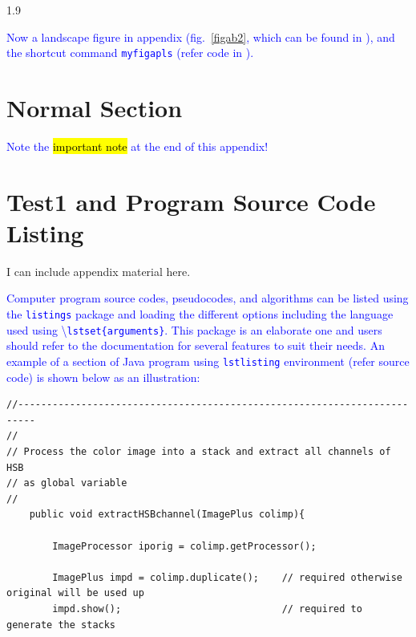 \documentclass[phd]{ndsu-thesis-2022}
\newcommand\myspacing{1.9}      %
\newcommand\italk[1]{\textcolor{blue}{#1}}  %
\newcommand\cmd[1]{\textbackslash\texttt{#1}}  %
\newcommand\vb[1]{\textcolor{blue}{\texttt{#1}}}%
\begin{document}
\begin{spacing}{\myspacing}


\italk{Now a landscape figure in appendix (fig.~\ref{figab2}, which can be found in \cpageref{figab2}), and the shortcut command \texttt{myfigapls} (refer code in \cpageref{figv}).}


\section{Normal Section}
\kant[11]



\italk{Note the \hl{important note} at the end of this appendix!}

\kant[3]

\section{Test1 and Program Source Code Listing}
I can include appendix material here. \kant[9] 

\italk{Computer program source codes, pseudocodes, and algorithms can be listed using the \vb{listings} package and loading the different options including the language used using \cmd{lstset\{arguments\}}. This package is an elaborate one and users should refer to the documentation for several features to suit their needs. An example of a section of Java program using \vb{lstlisting} environment (refer source code) is shown below as an illustration:}

{\singlespacing
\begin{lstlisting}
//-------------------------------------------------------------------------
//
// Process the color image into a stack and extract all channels of HSB 
// as global variable
//
	public void extractHSBchannel(ImagePlus colimp){

		ImageProcessor iporig = colimp.getProcessor();
		
		ImagePlus impd = colimp.duplicate();	// required otherwise original will be used up
		impd.show();						    // required to generate the stacks
		

\end{lstlisting}}
\end{spacing}
\end{document}
